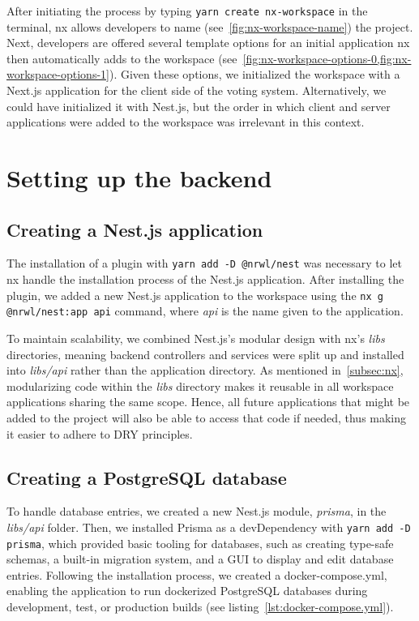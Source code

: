 After initiating the process by typing \texttt{yarn create nx-workspace} in the terminal, nx allows developers to name (see~\cref{fig:nx-workspace-name}) the project.
Next, developers are offered several template options for an initial application nx then automatically adds to the workspace (see~\cref{fig:nx-workspace-options-0,fig:nx-workspace-options-1}).
Given these options, we initialized the workspace with a Next.js application for the client side of the voting system.
Alternatively, we could have initialized it with Nest.js, but the order in which client and server applications were added to the workspace was irrelevant in this context.

\section{Setting up the backend}\label{sec:setting-up-a-nest.js-backend}

\subsection{Creating a Nest.js application}\label{subsec:creating-a-nest.js-application}

The installation of a plugin with \texttt{yarn add -D @nrwl/nest} was necessary to let nx handle the installation process of the Nest.js application.
After installing the plugin, we added a new Nest.js application to the workspace using the \texttt{nx g @nrwl/nest:app api} command, where \emph{api} is the name given to the application.

To maintain scalability, we combined Nest.js's modular design with nx's \emph{libs} directories, meaning backend controllers and services were split up and installed into \emph{libs/api} rather than the application directory.
As mentioned in~\cref{subsec:nx}, modularizing code within the \emph{libs} directory makes it reusable in all workspace applications sharing the same scope.
Hence, all future applications that might be added to the project will also be able to access that code if needed, thus making it easier to adhere to \gls{DRY} principles.

\subsection{Creating a PostgreSQL database}\label{subsec:creating-a-postgresql-database}

To handle database entries, we created a new Nest.js module, \emph{prisma}, in the \emph{libs/api} folder.
Then, we installed Prisma as a devDependency with \texttt{yarn add -D prisma}, which provided basic tooling for databases, such as creating type-safe schemas, a built-in migration system, and a \gls{GUI} to display and edit database entries.
Following the installation process, we created a docker-compose.yml, enabling the application to run dockerized PostgreSQL databases during development, test, or production builds (see listing~\ref{lst:docker-compose.yml}).

